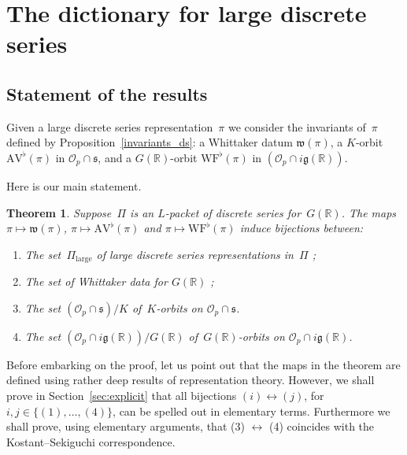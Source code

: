 \documentclass[10pt,leqno]{article}
\newtheorem{theorem}[equation]{Theorem}
\renewcommand{\O}{\mathcal O}
\newcommand{\R}{\mathbb R}
\newcommand{\g}{\mathfrak g}
\newcommand{\s}{\mathfrak s}
\newcommand{\AV}{\mathrm{AV}}
\newcommand{\WF}{\mathrm{WF}}
\newcommand{\Op}{\O_p}
\begin{document}
\section{The dictionary for large discrete series}


\subsection{Statement of the results}  



Given a large discrete series representation~$\pi$ we consider the invariants of~$\pi$ defined by Proposition~\ref{invariants_ds}: a Whittaker datum  $\mathfrak{w}(\pi)$, a $K$-orbit $\AV^\flat(\pi)$ in $\mathcal{O}_p \cap \mathfrak{s}$, and a $G(\R)$-orbit $\WF^\flat(\pi)$ in $(\mathcal{O}_p \cap  i \g(\R))$.

Here is our main statement.

\begin{theorem} \label{th:main} Suppose~$\Pi$ is an $L$-packet of discrete series for~$G(\R)$. 
The maps $\pi \mapsto \mathfrak{w}(\pi)$, $\pi \mapsto \AV^\flat(\pi)$ and $\pi\mapsto \WF^\flat(\pi)$ induce bijections between:
\begin{enumerate}
\item[(1)] The set~$\Pi_{\mathrm{large}}$ of large discrete series representations in~$\Pi$ ;
\item[(2)] The set of Whittaker data for $G(\R)$ ;
\item[(3)] The set $(\Op \cap \s)/K$ of~$K$-orbits on $\mathcal{O}_p \cap \s$.
\item[(4)] The set $(\Op \cap i\g(\R))/G(\R)$ of~$G(\R)$-orbits on $\mathcal{O}_p \cap  i \g(\R)$.
\end{enumerate}
\end{theorem}

Before embarking on the proof, let us point out that the maps in the theorem are defined using rather deep results of representation theory. However, we shall prove in Section~\ref{sec:explicit} that all bijections $(i) \leftrightarrow (j)$, for $i,j \in \{(1), \dots, (4)\}$, can be spelled out in elementary terms. Furthermore we shall prove, using elementary arguments, that (3) $\leftrightarrow$ (4) coincides with the Kostant--Sekiguchi correspondence.  
\end{document}
